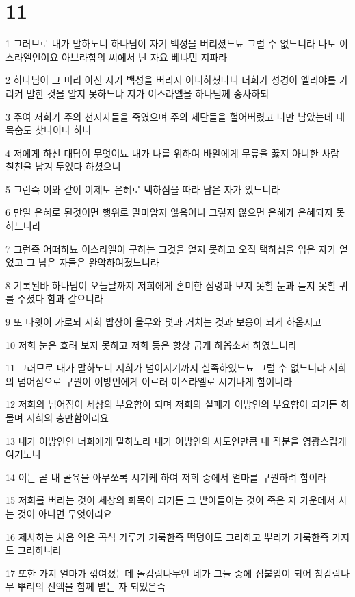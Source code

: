 \chapter{11}

\par 1 그러므로 내가 말하노니 하나님이 자기 백성을 버리셨느뇨 그럴 수 없느니라 나도 이스라엘인이요 아브라함의 씨에서 난 자요 베냐민 지파라
\par 2 하나님이 그 미리 아신 자기 백성을 버리지 아니하셨나니 너희가 성경이 엘리야를 가리켜 말한 것을 알지 못하느냐 저가 이스라엘을 하나님께 송사하되
\par 3 주여 저희가 주의 선지자들을 죽였으며 주의 제단들을 헐어버렸고 나만 남았는데 내 목숨도 찾나이다 하니
\par 4 저에게 하신 대답이 무엇이뇨 내가 나를 위하여 바알에게 무릎을 꿇지 아니한 사람 칠천을 남겨 두었다 하셨으니
\par 5 그런즉 이와 같이 이제도 은혜로 택하심을 따라 남은 자가 있느니라
\par 6 만일 은혜로 된것이면 행위로 말미암지 않음이니 그렇지 않으면 은혜가 은혜되지 못하느니라
\par 7 그런즉 어떠하뇨 이스라엘이 구하는 그것을 얻지 못하고 오직 택하심을 입은 자가 얻었고 그 남은 자들은 완악하여졌느니라
\par 8 기록된바 하나님이 오늘날까지 저희에게 혼미한 심령과 보지 못할 눈과 듣지 못할 귀를 주셨다 함과 같으니라
\par 9 또 다윗이 가로되 저희 밥상이 올무와 덫과 거치는 것과 보응이 되게 하옵시고
\par 10 저희 눈은 흐려 보지 못하고 저희 등은 항상 굽게 하옵소서 하였느니라
\par 11 그러므로 내가 말하노니 저희가 넘어지기까지 실족하였느뇨 그럴 수 없느니라 저희의 넘어짐으로 구원이 이방인에게 이르러 이스라엘로 시기나게 함이니라
\par 12 저희의 넘어짐이 세상의 부요함이 되며 저희의 실패가 이방인의 부요함이 되거든 하물며 저희의 충만함이리요
\par 13 내가 이방인인 너희에게 말하노라 내가 이방인의 사도인만큼 내 직분을 영광스럽게 여기노니
\par 14 이는 곧 내 골육을 아무쪼록 시기케 하여 저희 중에서 얼마를 구원하려 함이라
\par 15 저희를 버리는 것이 세상의 화목이 되거든 그 받아들이는 것이 죽은 자 가운데서 사는 것이 아니면 무엇이리요
\par 16 제사하는 처음 익은 곡식 가루가 거룩한즉 떡덩이도 그러하고 뿌리가 거룩한즉 가지도 그러하니라
\par 17 또한 가지 얼마가 꺾여졌는데 돌감람나무인 네가 그들 중에 접붙임이 되어 참감람나무 뿌리의 진액을 함께 받는 자 되었은즉
